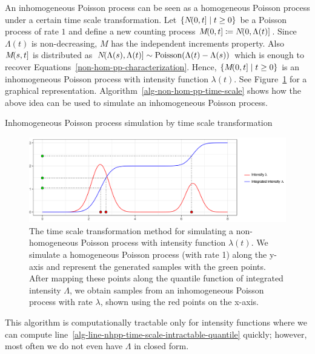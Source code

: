 \documentclass[report.tex]{subfiles}
\begin{document}
An inhomogeneous Poisson process can be seen as a homogeneous Poisson process
under a certain time scale transformation.
Let $\{{N}\!({0},{t}] \mid t \geq 0\}$
be a Poisson process of rate $1$ and define a new counting process
${M}\!({0},{t}] \coloneqq {N}\!({0},{\Lambda(t)}]$.
Since $\Lambda(t)$ is non-decreasing, $M$ has the independent increments property.
Also ${M}\!({s},{t}]$ is distributed as
${N}\!({\Lambda(s)},{\Lambda(t)}] \sim \text{Poisson}(\Lambda(t) - \Lambda(s))$
which is enough to recover Equations~\ref{non-hom-pp-characterization}.
Hence, $\{{M}\!({0},{t}] \mid t \geq 0\}$ is an inhomogeneous Poisson process
with intensity function $\lambda(t)$. See Figure~\ref{image-pp-time-scale-transformation}
for a graphical representation.
Algorithm~\ref{alg-non-hom-pp-time-scale} shows how the above idea can be used to
simulate an inhomogeneous Poisson process.
\begin{algorithm}
\caption{Inhomogeneous Poisson process simulation by time scale transformation}
\label{alg-non-hom-pp-time-scale}
\begin{algorithmic}[1]
      \label{alg-line-nhpp-time-scale-intractable-quantile}
  \EndFor
\end{algorithmic}
\end{algorithm}
\begin{figure}
  \includegraphics[width=\textwidth]{img/ch2-pp-time-scale}
  \caption{The time scale transformation method for simulating a
  non-homogeneous Poisson process with intensity function $\lambda(t)$.
  We simulate a homogeneous Poisson process (with rate 1) along the y-axis
  and represent the generated samples with the green points.
  After mapping these points along the quantile function of integrated intensity
  $\Lambda$, we obtain
  samples from an inhomogeneous Poisson process with rate $\lambda$, shown
  using the red points on the x-axis.}
  \label{image-pp-time-scale-transformation}
\end{figure}
This algorithm is computationally tractable only for intensity functions
where we can compute line~\ref{alg-line-nhpp-time-scale-intractable-quantile}
quickly; however, most often we do not even have $\Lambda$ in closed form.
\end{document}
